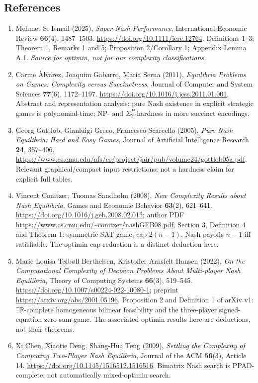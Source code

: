 \documentclass[11pt,a4paper]{article}
\providecommand{\ER}{\exists\mathbb R}
\begin{document}
\subsection*{References}\label{optimin:sec:refs}
\begin{enumerate}[leftmargin=2.75em,itemsep=4pt]
\item[S1] Mehmet S. Ismail (2025), \emph{Super-Nash Performance}, International Economic Review \textbf{66}(4), 1487--1503. \url{https://doi.org/10.1111/iere.12764}. Definitions 1--3; Theorem 1, Remarks 1 and 5; Proposition 2/Corollary 1; Appendix Lemma A.1. \textit{Source for optimin, not for our complexity classifications.}
\item[S2] Carme \`Alvarez, Joaquim Gabarro, Maria Serna (2011), \emph{Equilibria Problems on Games: Complexity versus Succinctness}, Journal of Computer and System Sciences \textbf{77}(6), 1172--1197. \url{https://doi.org/10.1016/j.jcss.2011.01.001}. Abstract and representation analysis: pure Nash existence in explicit strategic games is polynomial-time; NP- and $\Sigma_2^P$-hardness in more succinct encodings.
\item[S3] Georg Gottlob, Gianluigi Greco, Francesco Scarcello (2005), \emph{Pure Nash Equilibria: Hard and Easy Games}, Journal of Artificial Intelligence Research \textbf{24}, 357--406. \url{https://www.cs.cmu.edu/afs/cs/project/jair/pub/volume24/gottlob05a.pdf}. Relevant graphical/compact input restrictions; not a hardness claim for explicit full tables.
\item[S4] Vincent Conitzer, Tuomas Sandholm (2008), \emph{New Complexity Results about Nash Equilibria}, Games and Economic Behavior \textbf{63}(2), 621--641. \url{https://doi.org/10.1016/j.geb.2008.02.015}; author PDF \url{https://www.cs.cmu.edu/~conitzer/nashGEB08.pdf}. Section 3, Definition 4 and Theorem 1: symmetric SAT game, cap $2(n-1)$, Nash payoffs $n-1$ iff satisfiable. The optimin cap reduction is a distinct deduction here.
\item[S5] Marie Louisa T\o lb\o ll Berthelsen, Kristoffer Arnsfelt Hansen (2022), \emph{On the Computational Complexity of Decision Problems About Multi-player Nash Equilibria}, Theory of Computing Systems \textbf{66}(3), 519--545. \url{https://doi.org/10.1007/s00224-022-10080-1}; preprint \url{https://arxiv.org/abs/2001.05196}. Proposition 2 and Definition 1 of arXiv v1: $\ER$-complete homogeneous bilinear feasibility and the three-player signed-equation zero-sum game. The associated optimin results here are deductions, not their theorems.
\item[S6] Xi Chen, Xiaotie Deng, Shang-Hua Teng (2009), \emph{Settling the Complexity of Computing Two-Player Nash Equilibria}, Journal of the ACM \textbf{56}(3), Article 14. \url{https://doi.org/10.1145/1516512.1516516}. Bimatrix Nash search is PPAD-complete, not automatically mixed-optimin search.

\end{enumerate}
\end{document}
